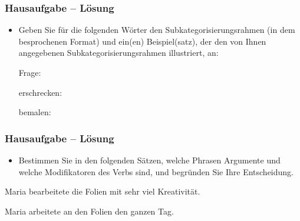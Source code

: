 \begin{frame}
\frametitle{Hausaufgabe -- Lösung} 

\begin{itemize}

\item Geben Sie für die folgenden Wörter den Subkategorisierungsrahmen (in dem besprochenen Format) und ein(en) Beispiel(satz), der den von Ihnen angegebenen Subkategorisierungsrahmen illustriert, an:

\settowidth \jamwidth{[Lesart 1]}

\ea Frage: \pause {}

\pause 

\ex erschrecken: \pause {} \jambox{\alertgreen{[Lesart 1]}}

\pause 

\ex bemalen: \pause {}

\z 


\end{itemize}

\end{frame}

\begin{frame}
\frametitle{Hausaufgabe -- Lösung} 

\begin{itemize}
	
	\item Bestimmen Sie in den folgenden Sätzen, welche Phrasen Argumente und welche Modifikatoren des Verbs sind, und begründen Sie Ihre Entscheidung.
	
\end{itemize}

\ea Maria bearbeitete die Folien mit sehr viel Kreativität.

\pause 
{}



\pause 


\ex Maria arbeitete an den Folien den ganzen Tag.

\pause 
{}



\z 

\end{frame}


